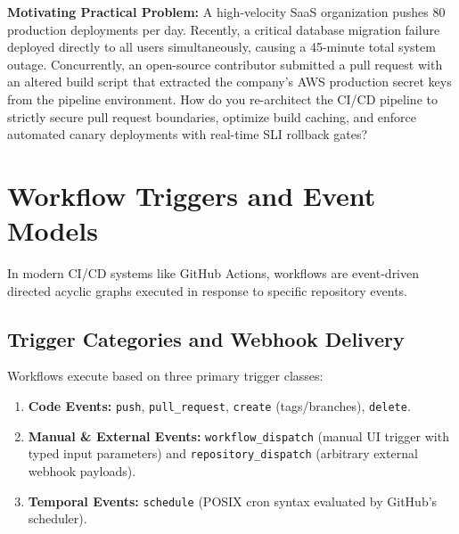\begin{chaptergoalsbox}
\textbf{Motivating Practical Problem:}
A high-velocity SaaS organization pushes 80 production deployments per day. Recently, a critical database migration failure deployed directly to all users simultaneously, causing a 45-minute total system outage. Concurrently, an open-source contributor submitted a pull request with an altered build script that extracted the company's AWS production secret keys from the pipeline environment. How do you re-architect the CI/CD pipeline to strictly secure pull request boundaries, optimize build caching, and enforce automated canary deployments with real-time SLI rollback gates?
\end{chaptergoalsbox}

\section{Workflow Triggers and Event Models}

In modern CI/CD systems like GitHub Actions, workflows are event-driven directed acyclic graphs executed in response to specific repository events.

\subsection{Trigger Categories and Webhook Delivery}
Workflows execute based on three primary trigger classes:
\begin{enumerate}[leftmargin=15pt]
  \item \textbf{Code Events:} \texttt{push}, \texttt{pull\_request}, \texttt{create} (tags/branches), \texttt{delete}.
  \item \textbf{Manual \& External Events:} \texttt{workflow\_dispatch} (manual UI trigger with typed input parameters) and \texttt{repository\_dispatch} (arbitrary external webhook payloads).
  \item \textbf{Temporal Events:} \texttt{schedule} (POSIX cron syntax evaluated by GitHub's scheduler).
\end{enumerate}


